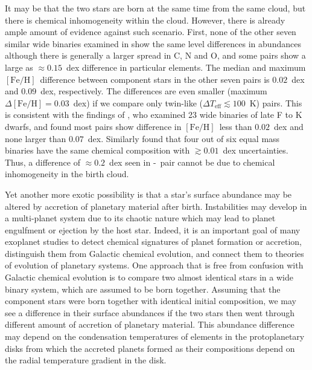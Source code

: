 \documentclass[manuscript]{aastex6}
\newcommand*\elem[1]{\ensuremath{\mathrm{#1}}}
\newcommand*\elemH[1]{\ensuremath{[\mathrm{#1}/\elem{H}]}}
\newcommand*{\feh}{\ensuremath{\elemH{Fe}}}
\newcommand{\sunanalog}{\text{Krios}}
\newcommand{\bizarreone}{\text{Kronos}}
\begin{document}
It may be that the two stars are born at the same time from the same cloud, but
there is chemical inhomogeneity within the cloud.
However, there is already ample amount of evidence against such scenario.
First, none of the other seven similar wide binaries examined in
\citealt{2016ApJS..225...32B} show the same level differences in abundances
although there is generally a larger spread in $\elem{C}$, $\elem{N}$ and
$\elem{O}$, and some pairs show a large as $\approx 0.15$~dex difference in
particular elements.
The median and maximum \feh\ difference between component stars in the other
seven pairs is $0.02$~dex and $0.09$~dex, respectively.
The differences are even smaller (maximum $\Delta\feh = 0.03$~dex)
if we compare only twin-like ($\Delta T_\mathrm{eff} \lesssim 100$~K) pairs.
This is consistent with the findings of \citealt{Desidera:2004aa}, who examined
23 wide binaries of late F to K dwarfs, and found most pairs show difference in
\feh\ less than $0.02$~dex and none larger than $0.07$~dex.
Similarly \citealt{Gratton:2001aa} found that four out of six equal mass binaries
have the same chemical composition with $\gtrsim 0.01$~dex uncertainties.
Thus, a difference of $\approx 0.2$~dex seen in \bizarreone-\sunanalog\ pair
cannot be due to chemical inhomogeneity in the birth cloud.

Yet another more exotic possibility is that a star's surface abundance may
be altered by accretion of planetary material after birth.
Instabilities may develop in a multi-planet system due to its chaotic nature
which may lead to planet engulfment or ejection by the host star.
Indeed, it is an important goal of many exoplanet studies
to detect chemical signatures of planet formation or accretion,
distinguish them from Galactic chemical evolution, and
connect them to theories of evolution of planetary systems.
One approach that is free from confusion with Galactic chemical evolution
is to compare two almost identical stars in a wide binary system,
which are assumed to be born together.
Assuming that the component stars were born together with identical
initial composition, we may see a difference in their surface abundances
if the two stars then went through different amount of accretion
of planetary material.
This abundance difference may depend on the condensation temperatures of
elements in the protoplanetary disks from which the accreted planets formed
as their compositions depend on the radial temperature gradient in the disk.
\end{document}
